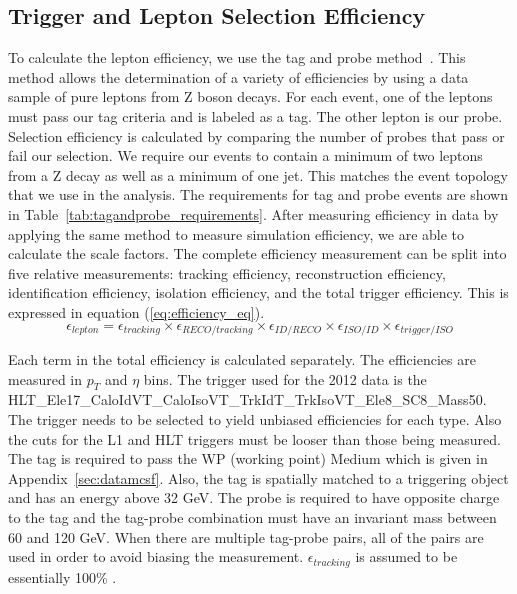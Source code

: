 \subsection{Trigger and Lepton Selection Efficiency}

To calculate the lepton efficiency, we use the tag and probe method~\cite{TagandProbe2012}. This method allows the determination of a variety of efficiencies by using a data sample of pure leptons from Z boson decays.  For each event, one of the leptons must pass our tag criteria and is labeled as a tag.  The other lepton is our probe. Selection efficiency is calculated by comparing the number of probes that pass or fail our selection. We require our events to contain a minimum of two leptons from a Z decay as well as a minimum of one jet.  This matches the event topology that we use in the analysis. The requirements for tag and probe events are shown in Table~\ref{tab:tagandprobe_requirements}. After measuring efficiency in data by applying the same method to measure simulation efficiency, we are able to calculate the scale factors. The complete efficiency measurement can be split into five relative measurements: tracking efficiency, reconstruction efficiency, identification efficiency, isolation efficiency, and the total trigger efficiency.  This is expressed in equation (\ref{eq:efficiency_eq}).
\begin{equation}
\epsilon_{lepton} = \epsilon_{tracking} \times \epsilon_{RECO/tracking} \times \epsilon_{ID/RECO} \times \epsilon_{ISO/ID} \times \epsilon_{trigger/ISO}
\label{eq:efficiency_eq}
\end{equation}

Each term in the total efficiency is calculated separately. The efficiencies are measured in $p_T$ and $\eta$ bins. The trigger used for the 2012 data is the HLT\_Ele17\_CaloIdVT\_CaloIsoVT\_TrkIdT\_TrkIsoVT\_Ele8\_SC8\_Mass50. The trigger needs to be selected to yield unbiased efficiencies for each type. Also the cuts for the L1 and HLT triggers must be looser than those being measured. The tag is required to pass the WP (working point) Medium which is given in Appendix~\ref{sec:datamcsf}. Also, the tag is spatially matched to a triggering object and has an energy above 32 GeV. The probe is required to have opposite charge to the tag and the tag-probe combination must have an invariant mass between 60 and 120 GeV.  When there are multiple tag-probe pairs, all of the pairs are used in order to avoid biasing the measurement. $\epsilon_{tracking}$ is assumed to be essentially 100\% \cite{WandZCrossSections}.

